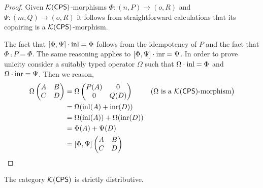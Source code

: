 \begin{proof}
         Given $\mathcal{K}{(\mathsf{CPS})}$-morphisms $\Phi : (n, P) \to (o, R)$ and $\Psi : (m, Q)
        \to (o,R)$ it follows from
        straightforward calculations that its copairing is a $\mathcal{K}{(\mathsf{CPS})}$-morphism.

        The fact that $[\Phi,\Psi] \cdot \mathrm{inl} = \Phi$ follows from the
        idempotency of $P$ and the fact that $\Phi \comp P = \Phi$. The same
        reasoning applies to $[\Phi,\Psi] \cdot \mathrm{inr} = \Psi$. In order to prove
        unicity consider a suitably typed operator $\Omega$ such that $\Omega
        \cdot \mathrm{inl} = \Phi$ and $\Omega \cdot \mathrm{inr} = \Psi$. Then we reason,
        \begin{align*}
        \Omega
        \begin{pmatrix}
         A & B 
         \\
         C & D
        \end{pmatrix} 
        & =
        \Omega
        \begin{pmatrix}
         P(A) & 0 
         \\
         0 & Q(D)
        \end{pmatrix} 
        & ( \text{$\Omega$ is a $\mathcal{K}{(\mathsf{CPS})}$-morphism} \big )
        \\
        & =
        \Omega
        (\mathrm{inl}(A) + \mathrm{inr}(D))
        \\
        & = 
        \Omega
        (\mathrm{inl}(A)) + \Omega(\mathrm{inr}(D))
        \\
        & = 
        \Phi(A) + \Psi(D)
        \\
        &
        = 
        [\Phi,\Psi]
        \begin{pmatrix}
         A & B 
         \\
         C & D
        \end{pmatrix} 
\end{align*}
\end{proof}

\begin{proposition} \label{prop:kar_dist}
        The category $\mathcal{K}{(\mathsf{CPS})}$ is strictly distributive.
\end{proposition}

